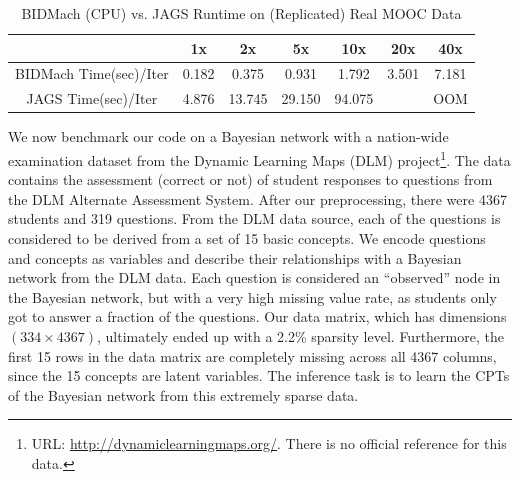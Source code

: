 \documentclass{article} %
\begin{document}
%
%
% 
%
%
%
\begin{table}[t]
\caption{BIDMach (CPU) vs. JAGS Runtime on (Replicated) Real MOOC Data}
\label{tab:bidmach_jags_realmooc}
\begin{center}
\begin{tabular}{ |c|c|c|c|c|c|c| } 
\hline
                       & 1x    & 2x     & 5x     & 10x    & 20x   & 40x   \\
\hline \hline
BIDMach Time(sec)/Iter & 0.182 & 0.375  & 0.931  & 1.792  & 3.501 & 7.181 \\ 
JAGS Time(sec)/Iter    & 4.876 & 13.745 & 29.150 & 94.075 &       & OOM   \\
\hline
\end{tabular}
\end{center}
\end{table}

We now benchmark our code on a Bayesian network with a nation-wide examination dataset from the
Dynamic Learning Maps (DLM) project\footnote{URL: \url{http://dynamiclearningmaps.org/}. There is no
official reference for this data.}. The data contains the assessment (correct or not) of student
responses to questions from the DLM Alternate Assessment System. After our preprocessing, there were
4367 students and 319 questions. From the DLM data source, each of the questions is considered to be
derived from a set of 15 basic concepts. We encode questions and concepts as variables and describe
their relationships with a Bayesian network from the DLM data.  Each question is considered an
``observed'' node in the Bayesian network, but with a very high missing value rate, as students only
got to answer a fraction of the questions.  Our data matrix, which has dimensions $(334\times
4367)$, ultimately ended up with a 2.2\% sparsity level.  Furthermore, the first 15 rows in the data
matrix are completely missing across all 4367 columns, since the 15 concepts are latent variables.
The inference task is to learn the CPTs of the Bayesian network from this extremely sparse data.
\end{document}
